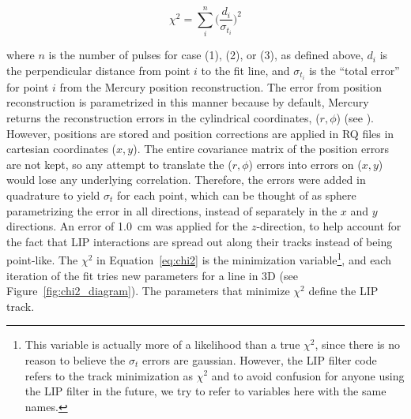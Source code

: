 \begin{equation}
\label{eq:chi2}
\chi^{2} = \sum_{i}^{n} \Big( \frac{d_{i}}{\sigma_{t_{i}}} \Big)^{2}
\end{equation}

where $n$ is the number of pulses for case (1), (2), or (3), as defined above, $d_{i}$ is the perpendicular distance from point $i$ to the fit line, and $\sigma_{t_{i}}$ is the ``total error'' for point $i$ from the Mercury position reconstruction. The error from position reconstruction is parametrized in this manner because by default, Mercury returns the reconstruction errors in the cylindrical coordinates, ($r, \phi$) (see \cite{LUXPositionReconstruction}). However, positions are stored and position corrections are applied in \ac{RQ} files in cartesian coordinates ($x, y$). The entire covariance matrix of the position errors are not kept, so any attempt to translate the ($r, \phi$) errors into errors on ($x, y$) would lose any underlying correlation. Therefore, the errors were added in quadrature to yield $\sigma_{t}$ for each point, which can be thought of as sphere parametrizing the error in all directions, instead of separately in the $x$ and $y$ directions. An error of 1.0~cm was applied for the $z$-direction, to help account for the fact that \ac{LIP} interactions are spread out along their tracks instead of being point-like. The $\chi^{2}$ in Equation~\ref{eq:chi2} is the minimization variable\footnote{This variable is actually more of a likelihood than a true $\chi^{2}$, since there is no reason to believe the $\sigma_{t}$ errors are gaussian. However, the \ac{LIP} filter code refers to the track minimization as $\chi^{2}$ and to avoid confusion for anyone using the \ac{LIP} filter in the future, we try to refer to variables here with the same names.}, and each iteration of the fit tries new parameters for a line in 3D (see Figure~\ref{fig:chi2_diagram}). The parameters that minimize $\chi^{2}$ define the \ac{LIP} track. 

